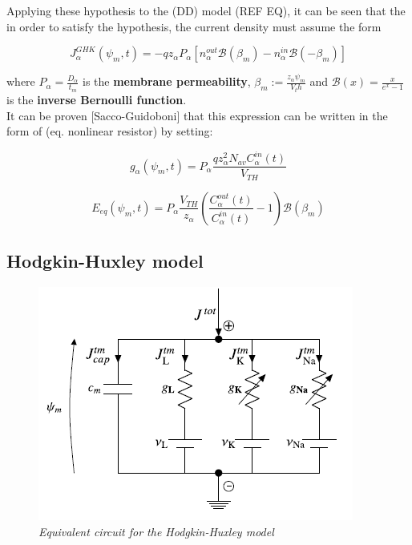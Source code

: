 \documentclass[a4paper]{article}
\begin{document}
Applying these hypothesis to the (DD) model (REF EQ),
it can be seen that the in order to satisfy the hypothesis, the current density must assume the form

\begin{equation}
	J_{\alpha}^{GHK}(\psi_m,t) = -qz_{\alpha}P_{\alpha}\left[n_{\alpha}^{out} \mathcal{B}(\beta_m) - n_{\alpha}^{in} \mathcal{B}(-\beta_m) \right]
\end{equation}

where $P_{\alpha} = \frac{D_{\alpha}}{t_m}$ is the \textbf{membrane permeability}, $ \beta_m := \frac{z_{\alpha} \psi_m}{V_th}$ and $ \mathcal{B}(x) = \frac{x}{e^x -1}$ is the \textbf{inverse Bernoulli function}.\\
It can be proven [Sacco-Guidoboni] that this expression can be written in the form of (eq. nonlinear resistor) by setting:

\begin{equation}
	g_{\alpha}(\psi_m,t) = P_{\alpha}\frac{q z_{\alpha}^2N_{av}C_{\alpha}^{in}(t)}{V_{TH}} 
\end{equation}

\begin{equation}
E_{eq}(\psi_m,t) = P_{\alpha}\frac{V_{TH}}{z_{\alpha}} \left(\frac{C_{\alpha}^{out}(t)}{C_{\alpha}^{in}(t)} - 1\right)\mathcal{B}(\beta_m)
	\end{equation}
	
	
	
	\subsection{Hodgkin-Huxley model}
	
	\begin{figure}[H]
		\begin{center}
			\includegraphics[scale=0.9]{HH.png} 
		\end{center} 
		\caption{\textit{Equivalent circuit for the Hodgkin-Huxley model}}
		
	\end{figure}
\end{document}

